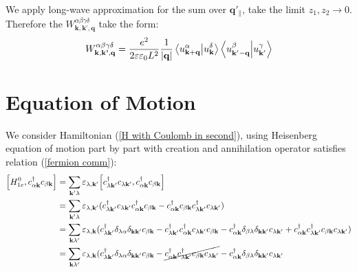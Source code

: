 \documentclass[12pt,english,a4paper]{article}
\newcommand{\dg}{\dagger}
\begin{document}
\begin{appendices}
\begin{align}
\end{align}
\quad We apply long-wave approximation for the sum over \(\textbf{q}'_{\|}\), take the limit $z_1, z_2 \to 0$. Therefore the $W^{\alpha\beta\gamma \delta}_{\textbf{k},\textbf{k'},\textbf{q}}$ take the form:
\begin{equation}
	W^{\alpha\beta\gamma \delta}_{\textbf{k},\textbf{k'},\textbf{q}} = \frac{e^2}{2\varepsilon \varepsilon_0 L^2} \frac{1}{|\textbf{q}|} \braket{u_{\textbf{k}+\textbf{q}}^{\alpha}}{u^{\delta}_{\textbf{k}}} \braket{u ^{\beta}_{\textbf{k}'-\textbf{q}}}{u^\gamma_{\textbf{k}'}}
\end{equation}
\newpage
\section{Equation of Motion}
\label{Motion Equation}
\quad We consider Hamiltonian (\ref{H with Coulomb in second}), using Heisenberg equation of motion part by part with creation and annihilation operator satisfies relation (\ref{fermion comm}):
\begin{align}
	\comm{H^{0}_{1e}}{c^\dg_{\alpha \textbf{k}} c_{\beta \textbf{k}}} &= \sum_{\textbf{k}' \lambda} \varepsilon_{\lambda,\textbf{k}'} \comm{c^\dg_{\lambda \textbf{k}'} c_{\lambda \textbf{k}'}}{c^\dg_{\alpha \textbf{k}} c_{\beta \textbf{k}}} \nonumber \\
	&= \sum_{\textbf{k}' \lambda} \varepsilon_{\lambda,\textbf{k}'} (c^\dg_{\lambda \textbf{k}'} c_{\lambda \textbf{k}'}c^\dg_{\alpha \textbf{k}} c_{\beta \textbf{k}} - c^\dg_{\alpha \textbf{k}} c_{\beta \textbf{k}}c^\dg_{\lambda \textbf{k}'} c_{\lambda \textbf{k}'})\nonumber \\
	& = \sum_{\textbf{k}\lambda'} \varepsilon_{\lambda,\textbf{k}}(c^\dg_{\lambda \textbf{k}'} \delta_{\lambda \alpha}\delta_{\textbf{k}\textbf{k}'} c_{\beta \textbf{k}} 
	- c^\dg_{\lambda \textbf{k}'}c^\dg_{\alpha \textbf{k}} c_{\lambda \textbf{k}'} c_{\beta \textbf{k}} 
	- c^\dg_{\alpha \textbf{k}} \delta_{\beta\lambda}\delta_{\textbf{k}\textbf{k}'} c_{\lambda \textbf{k}'} 
	+ c^\dg_{\alpha \textbf{k}}c^\dg_{\lambda \textbf{k}'} c_{\beta \textbf{k}} c_{\lambda \textbf{k}'}) \nonumber\\
	&= \sum_{\textbf{k}\lambda'} \varepsilon_{\lambda,\textbf{k}}(c^\dg_{\lambda \textbf{k}'} \delta_{\lambda \alpha}\delta_{\textbf{k}\textbf{k}'} c_{\beta \textbf{k}} 
	- \cancel{c^\dg_{\alpha \textbf{k}}c^\dg_{\lambda \textbf{k}'} c_{\beta \textbf{k}} c_{\lambda \textbf{k}'} }
	- c^\dg_{\alpha \textbf{k}} \delta_{\beta\lambda}\delta_{\textbf{k}\textbf{k}'} c_{\lambda \textbf{k}'} 

\end{align}
\end{appendices}
\end{document}
